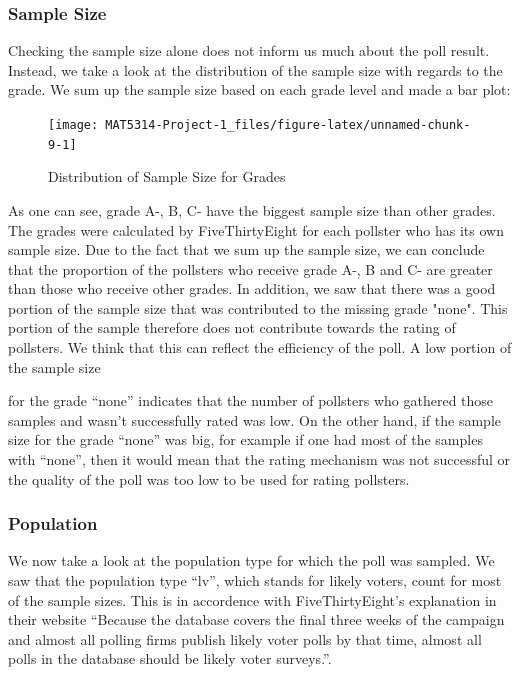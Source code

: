 \documentclass[
  12pt,
]{article}
\begin{document}
\hypertarget{sample-size}{%
\subsubsection{Sample Size}\label{sample-size}}

Checking the sample size alone does not inform us much about the poll
result. Instead, we take a look at the distribution of the sample size
with regards to the grade. We sum up the sample size based on each grade
level and made a bar plot:

\begin{minipage}[t]{0.55\textwidth}
\begin{figure}
\texttt{[image: MAT5314-Project-1\_files/figure-latex/unnamed-chunk-9-1]} \caption{Distribution of Sample Size for Grades}\label{fig:unnamed-chunk-9}
\end{figure}
\end{minipage}
\begin{minipage}[t]{0.45\textwidth}
\vspace{0pt}
As one can see, grade A-, B, C- have the biggest sample size than other grades. The grades were calculated by FiveThirtyEight for each pollster who has its own sample size. Due to the fact that we sum up the sample size, we can conclude that the proportion of the pollsters who receive grade A-, B and C- are greater than those who receive other grades. In addition, we saw that there was a good portion of the sample size that was contributed to the missing grade "none". This portion of the sample therefore does not contribute towards the rating of pollsters. We think that this can reflect the efficiency of the poll. A low portion of the sample size 
\end{minipage}

for the grade ``none'' indicates that the number of pollsters who
gathered those samples and wasn't successfully rated was low. On the
other hand, if the sample size for the grade ``none'' was big, for
example if one had most of the samples with ``none'', then it would mean
that the rating mechanism was not successful or the quality of the poll
was too low to be used for rating pollsters.

\hypertarget{population}{%
\subsubsection{Population}\label{population}}

We now take a look at the population type for which the poll was
sampled. We saw that the population type ``lv'', which stands for likely
voters, count for most of the sample sizes. This is in accordence with
FiveThirtyEight's explanation in their website ``Because the database
covers the final three weeks of the campaign and almost all polling
firms publish likely voter polls by that time, almost all polls in the
database should be likely voter surveys.''.
\end{document}
